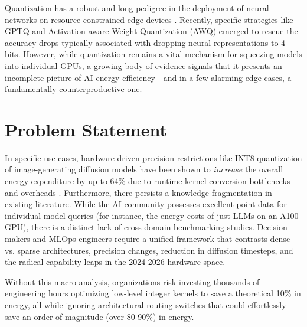 \documentclass[12pt, a4paper]{report}
\begin{document}
Quantization has a robust and long pedigree in the deployment of neural networks on resource-constrained edge devices \cite{dettmers2022gptint8}. Recently, specific strategies like GPTQ \cite{frantar2023gptq} and Activation-aware Weight Quantization (AWQ) \cite{lin2024awq} emerged to rescue the accuracy drops typically associated with dropping neural representations to 4-bits. However, while quantization remains a vital mechanism for squeezing models into individual GPUs, a growing body of evidence signals that it presents an incomplete picture of AI energy efficiency---and in a few alarming edge cases, a fundamentally counterproductive one.

\section{Problem Statement}
In specific use-cases, hardware-driven precision restrictions like INT8 quantization of image-generating diffusion models have been shown to \textit{increase} the overall energy expenditure by up to 64\% due to runtime kernel conversion bottlenecks and overheads \cite{huang2024tfmqdm, bertazzini2025hidden}. Furthermore, there persists a knowledge fragmentation in existing literature. While the AI community possesses excellent point-data for individual model queries (for instance, the energy costs of just LLMs on an A100 GPU), there is a distinct lack of cross-domain benchmarking studies. Decision-makers and MLOps engineers require a unified framework that contrasts dense vs. sparse architectures, precision changes, reduction in diffusion timesteps, and the radical capability leaps in the 2024-2026 hardware space.

Without this macro-analysis, organizations risk investing thousands of engineering hours optimizing low-level integer kernels to save a theoretical 10\% in energy, all while ignoring architectural routing switches that could effortlessly save an order of magnitude (over 80-90\%) in energy. 
\end{document}

